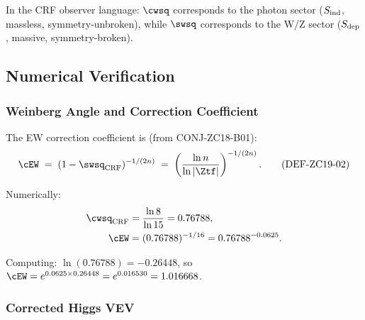 \documentclass[12pt, a4paper]{article}
\begin{document}
In the CRF observer language:
$\cwsq$ corresponds to the photon sector ($S_{\rm ind}$,
massless, symmetry-unbroken),
while $\swsq$ corresponds to the W/Z sector
($S_{\rm dep}$, massive, symmetry-broken).

\subsection{Numerical Verification}
\label{zc19:sec:verify}

\subsubsection{Weinberg Angle and Correction Coefficient}

The EW correction coefficient is (from CONJ-ZC18-B01):
\begin{equation}
  \cEW \;=\; (1-\swsq_{\rm CRF})^{-1/(2n)}
  \;=\; \left(\frac{\ln n}{\ln|\Ztf|}\right)^{-1/(2n)}.
  \tag{DEF-ZC19-02}
\end{equation}

Numerically:
\begin{align}
  \cwsq_{\rm CRF} &= \frac{\ln 8}{\ln 15} = 0.76788,
  \notag\\
  \cEW &= (0.76788)^{-1/16} = 0.76788^{-0.0625}.
  \notag
\end{align}

Computing: $\ln(0.76788) = -0.26448$, so
$\cEW = e^{0.0625\times 0.26448} = e^{0.016530} = 1.016668$.

\subsubsection{Corrected Higgs VEV}
\end{document}
